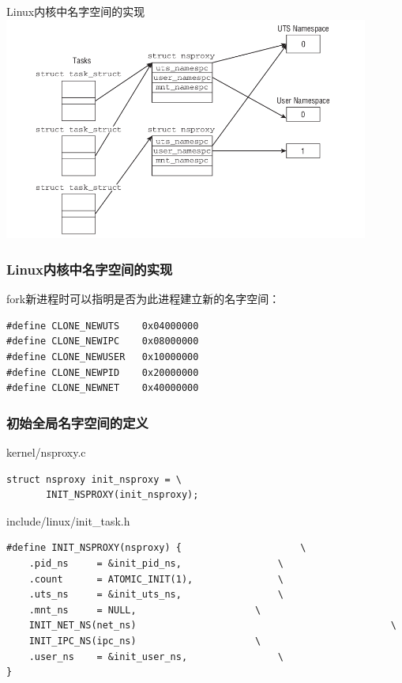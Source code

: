 \documentclass[xcolor=svgnames]{beamer}
\begin{document}
\begin{CJK*}{UTF8}{gbsn}
\begin{frame}{Linux内核中名字空间的实现}
\includegraphics[width=0.9\textwidth]{ns_impl.png}
\end{frame}

\begin{frame}[fragile]
\frametitle{Linux内核中名字空间的实现}
\begin{block}{fork新进程时可以指明是否为此进程建立新的名字空间：}
\begin{verbatim}
#define CLONE_NEWUTS    0x04000000  
#define CLONE_NEWIPC    0x08000000 
#define CLONE_NEWUSER   0x10000000
#define CLONE_NEWPID    0x20000000
#define CLONE_NEWNET    0x40000000 
\end{verbatim}
\end{block}
\end{frame}

\begin{frame}[fragile]
\frametitle{初始全局名字空间的定义}
\begin{block}{kernel/nsproxy.c}
\begin{verbatim}
struct nsproxy init_nsproxy = \
       INIT_NSPROXY(init_nsproxy);
\end{verbatim}
\end{block}
\begin{block}{include/linux/init\_task.h}
\begin{verbatim}
#define INIT_NSPROXY(nsproxy) {                     \
    .pid_ns     = &init_pid_ns,                 \
    .count      = ATOMIC_INIT(1),               \
    .uts_ns     = &init_uts_ns,                 \
    .mnt_ns     = NULL,                     \
    INIT_NET_NS(net_ns)                                             \
    INIT_IPC_NS(ipc_ns)                     \
    .user_ns    = &init_user_ns,                \
}

\end{verbatim}
\end{block}
\end{frame}


\end{CJK*}
\end{document}
